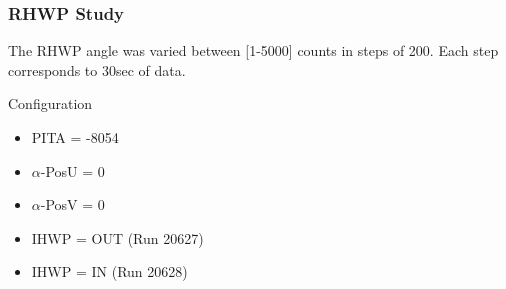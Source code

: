 \begin{frame}
	\frametitle{RHWP Study}
	The RHWP angle was varied between [1-5000] counts in steps of 200. Each step corresponds to \approx 30sec of data.
	
	
	\vspace{3mm}
	Configuration
	\begin{itemize}
		\item[\textbullet]	PITA  = -8054
		\item[\textbullet]	$\alpha$-PosU = 0
		\item[\textbullet]	$\alpha$-PosV = 0
		\item[\textbullet] IHWP = OUT (Run 20627)
		\item[\textbullet] IHWP = IN  (Run 20628)
	\end{itemize}
\end{frame}